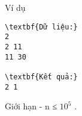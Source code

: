 Ví dụ  
\begin{verbatim}
\textbf{Dữ liệu:}
2
2 11
11 30

\textbf{Kết quả:}
2 1
\end{verbatim}
   Giới hạn  
- n ≤ $10^{5}$   .